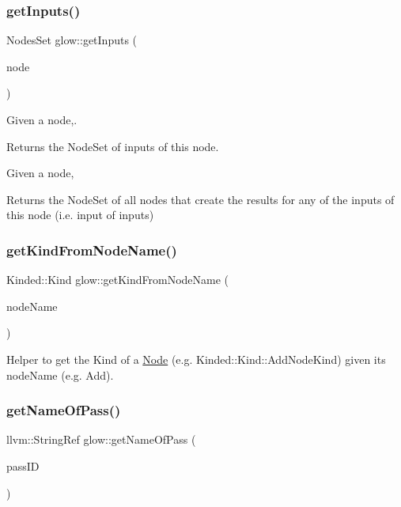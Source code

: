 \subsubsection{\texorpdfstring{get\+Inputs()}{getInputs()}}
{\footnotesize\ttfamily Nodes\+Set glow\+::get\+Inputs (\begin{DoxyParamCaption}\item[{const \hyperlink{classglow_1_1_node}{Node} $\ast$}]{node }\end{DoxyParamCaption})}



Given a node,. 

\begin{DoxyReturn}{Returns}
the Node\+Set of inputs of this node.
\end{DoxyReturn}
Given a node, \begin{DoxyReturn}{Returns}
the Node\+Set of all nodes that create the results for any of the inputs of this node (i.\+e. input of inputs) 
\end{DoxyReturn}
\mbox{\label{namespaceglow_af5d8953e310c3650356892fa4e866ce3}} 
\subsubsection{\texorpdfstring{get\+Kind\+From\+Node\+Name()}{getKindFromNodeName()}}
{\footnotesize\ttfamily Kinded\+::\+Kind glow\+::get\+Kind\+From\+Node\+Name (\begin{DoxyParamCaption}\item[{llvm\+::\+String\+Ref}]{node\+Name }\end{DoxyParamCaption})\hspace{0.3cm}{\ttfamily [inline]}}

Helper to get the Kind of a \hyperlink{classglow_1_1_node}{Node} (e.\+g. Kinded\+::\+Kind\+::\+Add\+Node\+Kind) given its {\ttfamily node\+Name} (e.\+g. Add). \mbox{\label{namespaceglow_a6195ce22fbeafd894c0ce148bb7a8a9a}} 
\subsubsection{\texorpdfstring{get\+Name\+Of\+Pass()}{getNameOfPass()}}
{\footnotesize\ttfamily llvm\+::\+String\+Ref glow\+::get\+Name\+Of\+Pass (\begin{DoxyParamCaption}\item[{\hyperlink{namespaceglow_a3157945b92abd634c79fa9d4724472eb}{Function\+Pass\+ID}}]{pass\+ID }\end{DoxyParamCaption})}


